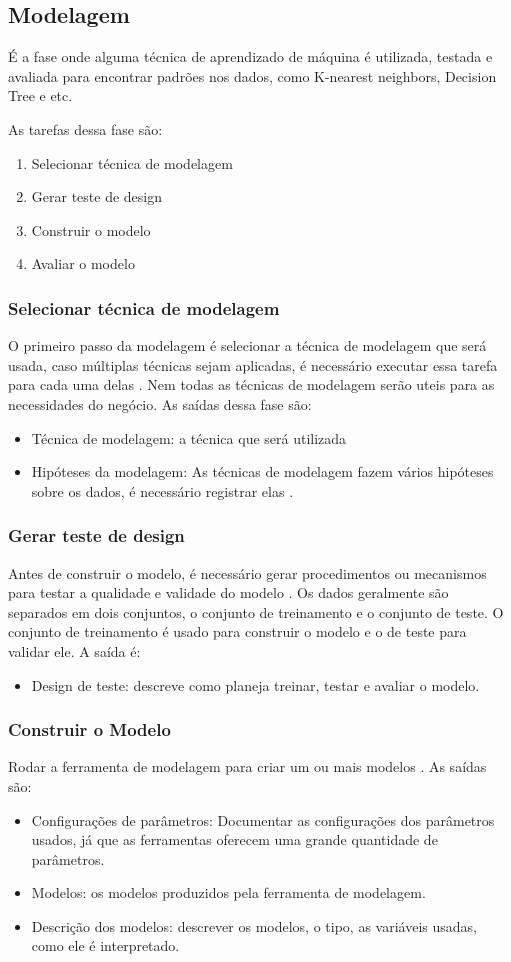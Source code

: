 \subsection{Modelagem}
É a fase onde alguma técnica de aprendizado de máquina é utilizada, testada e avaliada para encontrar padrões nos dados, como K-nearest neighbors, Decision Tree e etc.

As tarefas dessa fase são:
\begin{enumerate}
    \item Selecionar técnica de modelagem
    \item Gerar teste de design
    \item Construir o modelo
    \item Avaliar o modelo
\end{enumerate}
\subsubsection{Selecionar técnica de modelagem}
O primeiro passo da modelagem é selecionar a técnica de modelagem que será usada, caso múltiplas técnicas sejam aplicadas, é necessário executar essa tarefa para cada uma delas \citep[24]{crispmanual}.
Nem todas as técnicas de modelagem serão uteis para as necessidades do negócio.
As saídas dessa fase são:
\begin{itemize}
    \item Técnica de modelagem: a técnica que será utilizada
    \item Hipóteses da modelagem: As técnicas de modelagem fazem vários hipóteses sobre os dados, é necessário registrar elas \citep[24]{crispmanual}.
\end{itemize}
\subsubsection{Gerar teste de design}
Antes de construir o modelo, é necessário gerar procedimentos ou mecanismos para testar a qualidade e validade do modelo \citep[24]{crispmanual}. Os dados geralmente são separados em dois conjuntos, o conjunto de treinamento e o conjunto de teste. 
O conjunto de treinamento é usado para construir o modelo e o de teste para validar ele.
A saída é:
\begin{itemize}
    \item Design de teste: descreve como planeja treinar, testar e avaliar o modelo.
\end{itemize}
\subsubsection{Construir o Modelo}
Rodar a ferramenta de modelagem para criar um ou mais modelos \citep[24]{crispmanual}.
As saídas são:
\begin{itemize}
    \item Configurações de parâmetros: Documentar as configurações dos parâmetros usados, já que as ferramentas oferecem uma grande quantidade de parâmetros.
    \item Modelos: os modelos produzidos pela ferramenta de modelagem.
    \item Descrição dos modelos: descrever os modelos, o tipo, as variáveis usadas, como ele é interpretado. 
\end{itemize}
